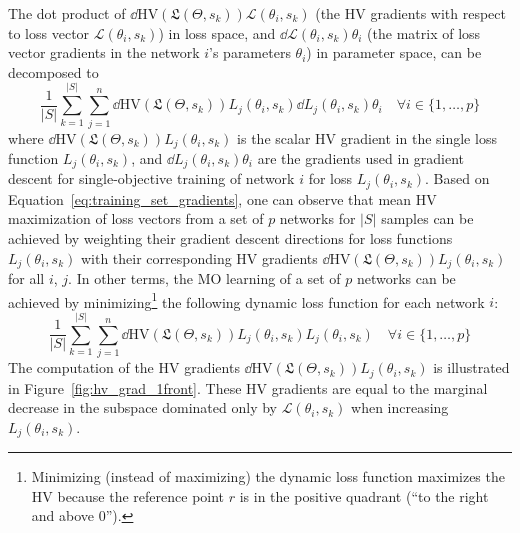 The dot product of $\dd{\mathrm{HV}\left( \mathfrak{L}(\Theta,s_{k}) \right)}{\mathcal{L}(\theta_{i},s_{k})}$ (the HV gradients with respect to loss vector $\mathcal{L}(\theta_{i},s_{k})$) in loss space,  
and $\dd{\mathcal{L}(\theta_{i},s_{k})}{\theta_{i}}$ (the matrix of loss vector gradients in the network $i$'s parameters $\theta_{i}$) in parameter space, can be decomposed to
\begin{equation}
 \frac{1}{|S|} \sum_{k=1}^{|S|}\sum_{j=1}^{n}\dd{\mathrm{HV}\left( \mathfrak{L}(\Theta,s_{k}) \right)}{L_{j}(\theta_{i},s_{k})}\dd{L_{j}(\theta_{i},s_{k})}{\theta_{i}} \quad\forall i\in\{1,\dots,p\} \label{eq:training_set_gradients}
\end{equation}
where $\dd{\mathrm{HV}(\mathfrak{L}(\Theta,s_{k}))}{L_{j}(\theta_{i},s_{k})}$ is the scalar HV gradient in the single loss function $L_{j}(\theta_{i},s_{k})$, and $\dd{L_{j}(\theta_{i},s_{k})}{\theta_{i}}$ are the gradients used in gradient descent for single-objective training of network $i$ for loss $L_{j}(\theta_{i}, s_{k})$. Based on Equation~\eqref{eq:training_set_gradients}, one can observe that mean HV maximization of loss vectors from a set of $p$ networks for $|S|$ samples can be achieved by weighting their gradient descent directions for loss functions $L_{j}(\theta_{i}, s_{k})$ with their corresponding HV gradients $\dd{\mathrm{HV}(\mathfrak{L}(\Theta,s_{k}))}{L_{j}(\theta_{i},s_{k})}$ for all $i$, $j$. In other terms, the MO learning of a set of $p$ networks can be achieved by minimizing\footnote{Minimizing (instead of maximizing) the dynamic loss function maximizes the HV because the reference point $r$ is in the positive quadrant (``to the right and above 0'').} the following dynamic loss function for each network $i$:
\begin{equation}
    \frac{1}{|S|}
    \sum_{k=1}^{|S|}\sum_{j=1}^{n}\dd{\mathrm{HV}\left( \mathfrak{L}(\Theta,s_{k}) \right)}{L_{j}(\theta_{i},s_{k})}L_{j}(\theta_{i},s_{k}) \quad\forall i\in\{1,\dots,p\} \label{eq:joint_loss_max_mean_hv_multi_sample}
\end{equation}
The computation of the HV gradients $\dd{\mathrm{HV}(\mathfrak{L}(\Theta,s_{k}))}{L_{j}(\theta_{i},s_{k})}$ is illustrated in Figure~\ref{fig:hv_grad_1front}. These HV gradients are equal to the marginal decrease in the subspace dominated only by $\mathcal{L}(\theta_{i},s_{k})$ when increasing $L_{j}(\theta_{i},s_{k})$.

